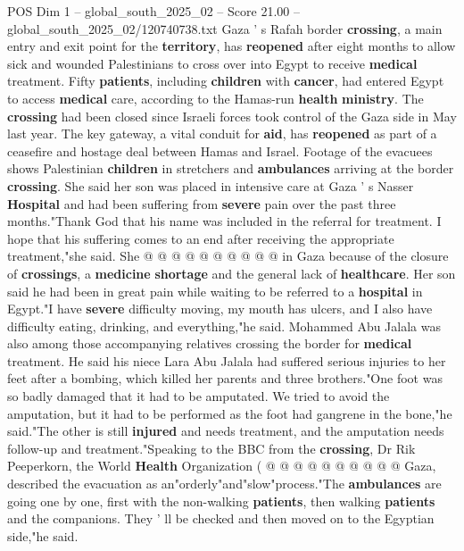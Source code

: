 \begin{textsample}{POS Dim 1 – global\_south\_2025\_02 – Score 21.00 – global\_south\_2025\_02/120740738.txt}  \label{ex:f1_pos_419}
Gaza ' s Rafah border \textbf{crossing}, a main entry and exit point for the \textbf{territory}, has \textbf{reopened} after eight months to allow sick and wounded Palestinians to cross over into Egypt to receive \textbf{medical} treatment.
Fifty \textbf{patients}, including \textbf{children} with \textbf{cancer}, had entered Egypt to access \textbf{medical} care, according to the Hamas-run \textbf{health} \textbf{ministry}.
The \textbf{crossing} had been closed since Israeli forces took control of the Gaza side in May last year.
The key gateway, a vital conduit for \textbf{aid}, has \textbf{reopened} as part of a ceasefire and hostage deal between Hamas and Israel.
Footage of the evacuees shows Palestinian \textbf{children} in stretchers and \textbf{ambulances} arriving at the border \textbf{crossing}.
She said her son was placed in intensive care at Gaza ' s Nasser \textbf{Hospital} and had been suffering from \textbf{severe} pain over the past three months."Thank God that his name was included in the referral for treatment.
I hope that his suffering comes to an end after receiving the appropriate treatment,"she said.
She @ @ @ @ @ @ @ @ @ @ in Gaza because of the closure of \textbf{crossings}, a \textbf{medicine} \textbf{shortage} and the general lack of \textbf{healthcare}.
Her son said he had been in great pain while waiting to be referred to a \textbf{hospital} in Egypt."I have \textbf{severe} difficulty moving, my mouth has ulcers, and I also have difficulty eating, drinking, and everything,"he said.
Mohammed Abu Jalala was also among those accompanying relatives crossing the border for \textbf{medical} treatment.
He said his niece Lara Abu Jalala had suffered serious injuries to her feet after a bombing, which killed her parents and three brothers."One foot was so badly damaged that it had to be amputated.
We tried to avoid the amputation, but it had to be performed as the foot had gangrene in the bone,"he said."The other is still \textbf{injured} and needs treatment, and the amputation needs follow-up and treatment."Speaking to the BBC from the \textbf{crossing}, Dr Rik Peeperkorn, the World \textbf{Health} Organization ( @ @ @ @ @ @ @ @ @ @ Gaza, described the evacuation as an"orderly"and"slow"process."The \textbf{ambulances} are going one by one, first with the non-walking \textbf{patients}, then walking \textbf{patients} and the companions.
They ' ll be checked and then moved on to the Egyptian side,"he said.

\end{textsample}
